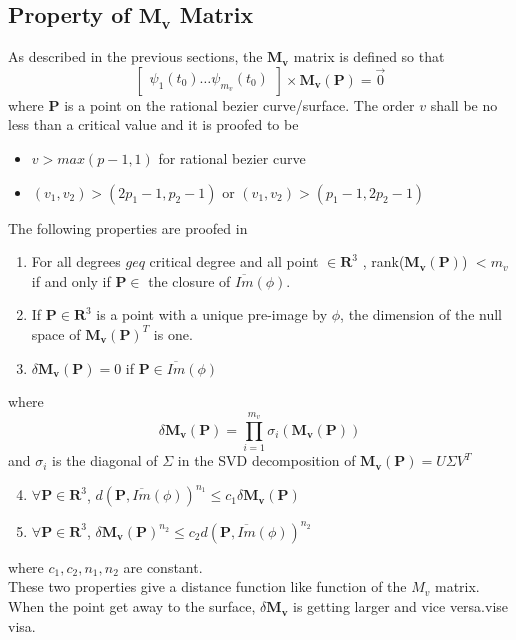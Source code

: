\subsection{Property of $\mathbf{M_v}$ Matrix}
As described in the previous sections, the $\mathbf{M_v}$ matrix is defined so that
\begin{equation*}
	\begin{bmatrix}
	\psi_1(t_0) \dots \psi_{m_v}(t_0)
	\end{bmatrix}
	\times
	\mathbf{M_v(\mathbf{P})}
	= \vec{0}
\end{equation*}
where $\mathbf{P}$ is a point on the rational bezier curve/surface.
The order $v$ shall be no less than a critical value and it is proofed to be
\begin{itemize}
	\item $v>max(p-1,1)$ for rational bezier curve
	\item $(v_1,v_2) > (2p_1 -1, p_2 -1)$ or  $(v_1,v_2) > (p_1 -1, 2p_2 -1)$
\end{itemize}
The following properties are proofed in \cite{Laurent2014}
\begin{enumerate}
	\item For all degrees $geq$ critical degree and all point $\in\mathbf{R}^3$ , rank($\mathbf{M_v}(\mathbf{P})$) $<m_v$ if and only if $\mathbf{P}\in$ the closure of $\overline{Im}(\phi)$.
	\item If $\mathbf{P}\in\mathbf{R}^3$ is a point with a unique pre-image by $\phi$, the dimension of the null space of $\mathbf{M_v}(\mathbf{P})^T$ is one. 
	\item $\delta\mathbf{M_v}(\mathbf{P}) = 0$ if $\mathbf{P} \in\overline{Im}(\phi)$
\end{enumerate}
where 
\begin{equation*}
	\delta\mathbf{M_v}(\mathbf{P}) = \prod_{i=1}^{m_v}\sigma_i(\mathbf{M_v}(\mathbf{P}))
\end{equation*}
and $\sigma_i$ is the diagonal of $\Sigma$ in the SVD decomposition of $\mathbf{M_v}(\mathbf{P})=U\Sigma V^T$

\begin{enumerate}
	\setcounter{enumi}{3}
	\item $\forall\mathbf{P}\in\mathbf{R}^3$, $d(\mathbf{P},\overline{Im}(\phi))^{n_1}\leq c_1 \delta\mathbf{M_v}(\mathbf{P})$
	\item $\forall\mathbf{P}\in\mathbf{R}^3$, $\delta\mathbf{M_v}(\mathbf{P})^{n_2}\leq c_2 d(\mathbf{P},\overline{Im}(\phi))^{n_2} $
\end{enumerate}
where $c_1,c_2,n_1,n_2$ are constant.\\
These two properties give a distance function like function of the $M_v$ matrix. When the point get away to the surface, $\delta\mathbf{M_v}$ is getting larger and vice versa.vise visa.
